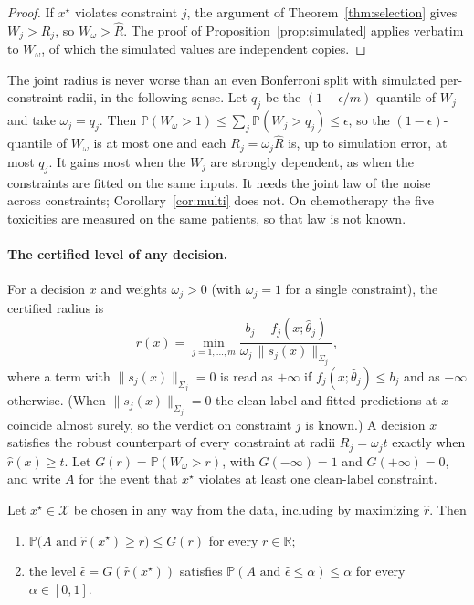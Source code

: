 \begin{proof}
If $x^\star$ violates constraint $j$, the argument of
Theorem~\ref{thm:selection} gives $W_j > R_j$, so $W_\omega > \hat R$. The
proof of Proposition~\ref{prop:simulated} applies verbatim to $W_\omega$, of
which the simulated values are independent copies.
\end{proof}

The joint radius is never worse than an even Bonferroni split with simulated
per-constraint radii, in the following sense. Let $q_j$ be the
$(1-\epsilon/m)$-quantile of $W_j$ and take $\omega_j = q_j$. Then
$\mathbb{P}(W_\omega > 1) \le \sum_j \mathbb{P}(W_j > q_j) \le \epsilon$, so
the $(1-\epsilon)$-quantile of $W_\omega$ is at most one and each
$R_j = \omega_j\hat R$ is, up to simulation error, at most $q_j$. It gains
most when the $W_j$ are strongly dependent, as when the constraints are
fitted on the same inputs. It needs the joint law of the noise across
constraints; Corollary~\ref{cor:multi} does not. On chemotherapy the five
toxicities are measured on the same patients, so that law is not known.

\paragraph{The certified level of any decision.}
For a decision $x$ and weights $\omega_j > 0$ (with $\omega_j = 1$ for a
single constraint), the certified radius is
\[
  \hat r(x) = \min_{j = 1,\dots,m}
    \frac{b_j - f_j(x;\hat\theta_j)}{\omega_j\,\|s_j(x)\|_{\Sigma_j}} ,
\]
where a term with $\|s_j(x)\|_{\Sigma_j} = 0$ is read as $+\infty$ if
$f_j(x;\hat\theta_j) \le b_j$ and as $-\infty$ otherwise. (When
$\|s_j(x)\|_{\Sigma_j} = 0$ the clean-label and fitted predictions at $x$
coincide almost surely, so the verdict on constraint $j$ is known.) A
decision $x$ satisfies the robust counterpart of every constraint at radii
$R_j = \omega_j t$ exactly when $\hat r(x) \ge t$. Let
$G(r) = \mathbb{P}(W_\omega > r)$, with $G(-\infty) = 1$ and
$G(+\infty) = 0$, and write $A$ for the event that $x^\star$ violates at least
one clean-label constraint.

\begin{proposition}\label{prop:certified}
Let $x^\star \in \mathcal{X}$ be chosen in any way from the data, including by
maximizing $\hat r$. Then
\begin{enumerate}[label=(\roman*)]
  \item $\mathbb{P}\bigl(A \text{ and } \hat r(x^\star) \ge r\bigr) \le G(r)$
    for every $r \in \mathbb{R}$;
  \item the level $\hat\epsilon = G(\hat r(x^\star))$ satisfies
    $\mathbb{P}(A \text{ and } \hat\epsilon \le \alpha) \le \alpha$ for every
    $\alpha \in [0,1]$.
\end{enumerate}
\end{proposition}

